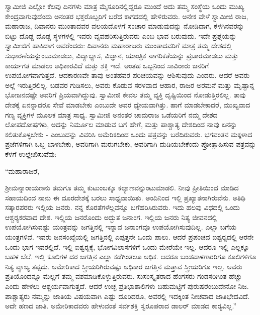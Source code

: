  ಸ್ವಾಮೀಜಿ ಎಲ್ಲೋ ಕೆಲವು ದಿನಗಳು ಮಾತ್ರ ಮೈಸೂರಿನಲ್ಲಿದ್ದರೂ ಮುಂದೆ ಅದು ತಮ್ಮ ಸಂಸ್ಥೆಯ ಒಂದು ಮುಖ್ಯ ಕೇಂದ್ರವಾಗುವುದೆಂದು ಅನಂತರ ಭಕ್ತರೊಬ್ಬರಿಗೆ ಬರೆದ ಕಾಗದದಲ್ಲಿ ಹೇಳಿರುವರು. ಅನೇಕ ವೇಳೆ ಸ್ವಾಮೀಜಿ ರಾಜ, ಮಹಾರಾಜ, ದಿವಾನರು ಮುಂತಾದವರ ವಲಯದೊಳಗೆ ಸಂಚಾರ ಮಾಡುವುದನ್ನು ನೋಡಿದಾಗ, ಕೆಳಗಿನವರನ್ನು ಬಿಟ್ಟು ದೊಡ್ಡ ದೊಡ್ಡ ಸ್ಥಳಗಳಲ್ಲಿ ಇವರು ವ್ಯವಹರಿಸುತ್ತಿರುವರು ಎಂಬ ಭಾವ ಬರುವುದು. ಇದೇ ಪ್ರಶ್ನೆಯನ್ನು ಸ್ವಾಮೀಜಿಗೆ ಹಾಕಿದಾಗ ಅವರೆಂದರು: ದಿವಾನರು ಮಹಾರಾಜರು ಮುಂತಾದವರಿಗೆ ಮಾತ್ರ ತಮ್ಮ ದೇಶದಲ್ಲಿ ಸುಧಾರಣೆಯನ್ನುಂಟುಮಾಡಲು, ವಿದ್ಯಾಭ್ಯಾಸ, ವಿಜ್ಞಾನ, ಯಾಂತ್ರಿಕ ನಾಗರಿಕತೆಯನ್ನು ಪ್ರಚಾರಮಾಡಲು ಮತ್ತು ಕಾರ್ಯಗತ ಮಾಡಲು ಅಧಿಕಾರವಿದೆ ಮತ್ತು ಶಕ್ತಿ ಇದೆ. ಅಂತಹ ಒಬ್ಬನಿಂದ ಸಾವಿರಾರು ಜನರಿಗೆ ಉಪಯೋಗವಾಗುತ್ತದೆ. ಆದಕಾರಣವೇ ತಾವು ಅಂತಹವರ ಪರಿಚಯವನ್ನು ಆಶಿಸುವುದು ಎಂದರು. ಆದರೆ ಅವರು ಅಲ್ಲೆ ಇರುತ್ತಿರಲಿಲ್ಲ. ಬಡವರ ಗುಡಿಸಲು, ಅವರು ಕೊಡುವ ಸರಳವಾದ ಆಹಾರ, ರಾಜರ ಅರಮನೆ ಮತ್ತು ಮೃಷ್ಟಾನ್ನ ಭೋಜನದಷ್ಟೇ ಅವರಿಗೆ ಪ್ರಿಯವಾಗಿದ್ದುವು. ಸ್ವಾಮೀಜಿ ಕೇವಲ ತಮ್ಮ ವ್ಯಕ್ತಿ ದೃಷ್ಟಿಯಿಂದ ನೋಡುತ್ತಿರಲಿಲ್ಲ. ತಾವು ದೇಶಕ್ಕೆ ಏನನ್ನಾದರೂ ಸೇವೆ ಮಾಡಬೇಕು ಎಂಬುದೇ ಅವರ ಧ್ಯೇಯವಾಗಿತ್ತು. ಹಾಗೆ ಮಾಡಬೇಕಾದರೆ, ಮುಖ್ಯವಾದ ಗಣ್ಯ ವ್ಯಕ್ತಿಗಳ ಮೂಲಕ ಮಾತ್ರ ಸಾಧ್ಯ. ಸ್ವಾಮೀಜಿ ಅನಂತರ ಚಾಮರಾಜ ಒಡೆಯರಿಗೆ ನಮ್ಮ ದೇಶದ ಲೋಪದೋಷಗಳು, ಅದನ್ನು ನಿರ್ಮೂಲ ಮಾಡುವ ಬಗೆ ಹೇಗೆ, ಮತ್ತು ಪಾಶ್ಚಾತ್ಯ ದೇಶದಿಂದ ನಾವು ಏನನ್ನು ಕಲಿತುಕೊಳ್ಳಬೇಕು - ಎಂಬುದನ್ನು ವಿವರಿಸಿ ಅಮೆರಿಕದಿಂದ ಒಂದು ಪತ್ರವನ್ನು ಬರೆದಿರುವರು. ಭಗವಂತನ ಮಕ್ಕಳಾದ ಪ್ರಜೆಗಳಿಗಾಗಿ ಒಬ್ಬ ಬಾಳಬೇಕು, ಅವರಿಗಾಗಿ ಮರುಗಬೇಕು, ಅವರಿಗಾಗಿ ದುಡಿಯಬೇಕೆಂದು ಪ್ರೋತ್ಸಾಹಿಸುವ ಪತ್ರವನ್ನು ಕೆಳಗೆ ಉಲ್ಲೇಖಿಸುವೆವು: 

 “ಮಹಾರಾಜರೆ, 

 ಶ‍್ರೀಮನ್ನಾರಾಯಣನು ತಮಗೂ ತಮ್ಮ ಕುಟುಂಬಕ್ಕೂ ಕಲ್ಯಾಣವನ್ನುಂಟುಮಾಡಲಿ. ನೀವು ಪ್ರೀತಿಯಿಂದ ಮಾಡಿದ ಸಹಾಯದಿಂದ ನಾನು ಈ ದೂರದೇಶಕ್ಕೆ ಬರಲು ಸಾಧ್ಯವಾಯಿತು. ಅಂದಿನಿಂದ ಇಲ್ಲಿ ಪ್ರಖ್ಯಾತನಾಗಿರುವೆನು. ಅತಿಥಿ ಸತ್ಕಾರಪರರು ಇಲ್ಲಿಯ ಜನರು. ನನ್ನ ಕೊರತೆಗಳೆಲ್ಲವನ್ನೂ ಬಗೆಹರಿಸಿರುವರು. ಇದು ಹಲವು ವಿಧದಲ್ಲಿ ಒಂದು ಆಶ್ಚರ‍್ಯಕರವಾದ ದೇಶ. ಇಲ್ಲ್ಲಿಯ ಜನರೊಂದು ಅದ್ಭುತ ಜನಾಂಗ. ಇಲ್ಲಿಯ ಜನರು ನಿತ್ಯ ಜೀವನದಲ್ಲಿ ಉಪಯೋಗಿಸುವಷ್ಟು ಯಂತ್ರವನ್ನು ಜಗತ್ತಿನಲ್ಲಿ ಇನ್ನಾವ ಜನಾಂಗವೂ ಉಪಯೋಗಿಸುವುದಿಲ್ಲ. ಎಲ್ಲಾ ಬಗೆಯ ಯಂತ್ರಗಳಿವೆ. ಇವರು ಜನಸಂಖ್ಯೆಯಲ್ಲಿ ಜಗತ್ತಿನಲ್ಲಿ ಎಪ್ಪತ್ತನೇ ಒಂದು ಪಾಲು. ಆದರೆ ಪ್ರಪಂಚದ ಐಶ್ವರ‍್ಯದಲ್ಲಿ ಆರನೇ ಒಂದು ಭಾಗ ಇವರಲ್ಲಿದೆ. ಇಲ್ಲಿ ಐಶ್ವರ‍್ಯಕ್ಕೆ, ಭೋಗವಿಲಾಸಗಳಿಗೆ ಒಂದು ಮೇರೆಯೇ ಇಲ್ಲ. ಆದರೂ ಇಲ್ಲಿ ಎಲ್ಲಕ್ಕೂ ಬಹಳ ಬೆಲೆ. ಇಲ್ಲಿ ಕೂಲಿಗಳ ದರ ಜಗತ್ತಿನ ಎಲ್ಲಾ ಕಡೆಗಿಂತಲೂ ಅಧಿಕ. ಆದರೂ ಬಂಡವಾಳಗಾರರಿಗೂ ಕೂಲಿಗಳಿಗೂ ನಿತ್ಯ ವ್ಯಾಜ್ಯ ತಪ್ಪದು. ಅಮೇರಿಕಾದ ಸ್ತ್ರೀಯರಿಗಿರುವಷ್ಟು ಅಧಿಕಾರ ಜಗತ್ತಿನ ಮತ್ತಾವ ಸ್ತ್ರೀಯರಿಗೂ ಇಲ್ಲ. ಅವರು ಪ್ರತಿಯೊಂದನ್ನೂ ಮೆಲ್ಲಗೆ ತಮ್ಮ ವಶಮಾಡಿಕೊಳ್ಳುತ್ತಿರುವರು. ಸುಸಂಸ್ಕೃತರಾದ ಹೆಂಗಸರು ಗಂಡಸರಿಗಿಂತ ಹೆಚ್ಚು ಎಂದು ಹೇಳಲು ಆಶ್ಚರ್ಯವಾಗುತ್ತದೆ. ಆದರೆ ಉಚ್ಛ ಪ್ರತಿಭಾಶಾಲಿಗಳು ಬಹುಮಟ್ಟಿಗೆ ಪುರುಷರೆಂಬುದೇನೋ ನಿಜ. ಪಾಶ್ಚಾತ್ಯರು ನಮ್ಮನ್ನು ಜಾತಿಯ ವಿಷಯವಾಗಿ ಎಷ್ಟು ದೂರಿದರೂ, ಅವರಲ್ಲಿ ಇದಕ್ಕಿಂತ ನೀಚವಾದ ಜಾತಿಭೇದವಿದೆ. ಅದೇ ಹಣದ ಜಾತಿ. ಅಮೇರಿಕಾದವರು ಹೇಳುವಂತೆ ಸರ್ವಶಕ್ತಿ ಸ್ವರೂಪರಾದ ಡಾಲರ್ ಮಾಡದ ಕಾರ‍್ಯವಿಲ್ಲ.” 

